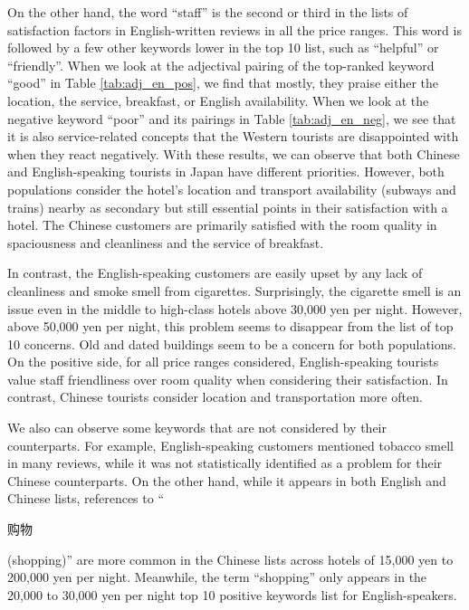 \documentclass[smallextended,natbib]{svjour3}       %
\begin{document}
    On the other hand, the word ``staff'' is the second or third in the lists of satisfaction factors in English-written reviews in all the price ranges. This word is followed by a few other keywords lower in the top 10 list, such as ``helpful'' or ``friendly''. When we look at the adjectival pairing of the top-ranked keyword ``good'' in Table \ref{tab:adj_en_pos}, we find that mostly, they praise either the location, the service, breakfast, or English availability. When we look at the negative keyword ``poor'' and its pairings in Table \ref{tab:adj_en_neg}, we see that it is also service-related concepts that the Western tourists are disappointed with when they react negatively. With these results, we can observe that both Chinese and English-speaking tourists in Japan have different priorities. However, both populations consider the hotel's location and transport availability (subways and trains) nearby as secondary but still essential points in their satisfaction with a hotel. The Chinese customers are primarily satisfied with the room quality in spaciousness and cleanliness and the service of breakfast.

    In contrast, the English-speaking customers are easily upset by any lack of cleanliness and smoke smell from cigarettes. Surprisingly, the cigarette smell is an issue even in the middle to high-class hotels above 30,000 yen per night. However, above 50,000 yen per night, this problem seems to disappear from the list of top 10 concerns. Old and dated buildings seem to be a concern for both populations. On the positive side, for all price ranges considered, English-speaking tourists value staff friendliness over room quality when considering their satisfaction. In contrast, Chinese tourists consider location and transportation more often.

    We also can observe some keywords that are not considered by their counterparts. For example, English-speaking customers mentioned tobacco smell in many reviews, while it was not statistically identified as a problem for their Chinese counterparts. On the other hand, while it appears in both English and Chinese lists, references to ``\begin{CJK}{UTF8}{gbsn}购物\end{CJK} (shopping)'' are more common in the Chinese lists across hotels of 15,000 yen to 200,000 yen per night. Meanwhile, the term ``shopping'' only appears in the 20,000 to 30,000 yen per night top 10 positive keywords list for English-speakers.
\end{document}

